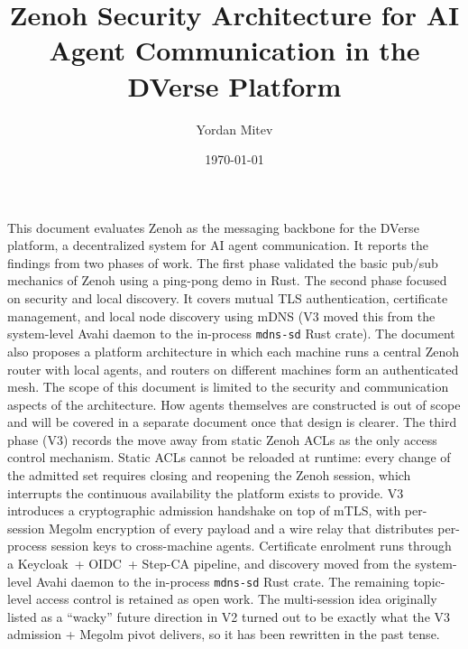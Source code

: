 \documentclass[11pt,a4paper]{article}
\title{%
  \vspace{-1cm}
  {\LARGE\bfseries Zenoh Security Architecture for AI Agent
  Communication in the DVerse Platform}
}
\author{Yordan Mitev}
\date{\today}
\begin{document}
\maketitle
\thispagestyle{fancy}

\begin{abstractbox}
  This document evaluates Zenoh as the messaging backbone for the
  DVerse platform, a decentralized system for AI agent communication.
  It reports the findings from two phases of work. The first phase
  validated the basic pub/sub mechanics of Zenoh using a ping-pong
  demo in Rust. The second phase focused on security and local
  discovery. It covers mutual TLS authentication, certificate
  management, and local node discovery using mDNS (V3 moved this
  from the system-level Avahi daemon to the in-process
  \texttt{mdns-sd} Rust crate). The
  document also proposes a platform architecture in which each
  machine runs a central Zenoh router with local agents, and routers
  on different machines form an authenticated mesh. The scope of this
  document is limited to the security and communication aspects of
  the architecture. How agents themselves are constructed is out of
  scope and will be covered in a separate document once that design
  is clearer. The third phase (V3) records the move away from static
  Zenoh ACLs as the only access control mechanism. Static ACLs cannot
  be reloaded at runtime: every change of the admitted set requires
  closing and reopening the Zenoh session, which interrupts the
  continuous availability the platform exists to provide. V3
  introduces a cryptographic admission handshake on top of mTLS, with
  per-session Megolm encryption of every payload and a wire relay that
  distributes per-process session keys to cross-machine agents.
  Certificate enrolment runs through a Keycloak~+ OIDC~+ Step-CA
  pipeline, and discovery moved from the system-level Avahi daemon
  to the in-process \texttt{mdns-sd} Rust crate. The
  remaining topic-level access control is retained as open work.
  The multi-session idea originally listed as a ``wacky'' future
  direction in V2 turned out to be exactly what the V3 admission +
  Megolm pivot delivers, so it has been rewritten in the past tense.
\end{abstractbox}

\vspace{1em}
\end{document}
